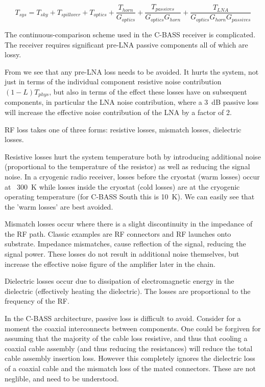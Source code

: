 \begin{equation}
 T_{sys} = T_{sky}+T_{spillover}+T_{optics} + \frac{T_{horn}}{G_{optics}} + \frac{T_{passives}}{G_{optics}G_{horn}}+\frac{T_{LNA}}{G_{optics}G_{horn}G_{passives}}
\label{eq:Friis_Equation}
\end{equation}

The continuous-comparison scheme used in the C-BASS receiver is complicated. The receiver requires significant pre-LNA passive components all of which are lossy. 

From  we see that any pre-LNA loss needs to be avoided. It hurts the system, not just in terms of the individual component resistive noise contribution $(1-L)T_{phys}$, but also in terms of the effect these losses have on subsequent components, in particular the LNA noise contribution, where a 3~dB passive loss will increase the effective noise contribution of the LNA by a factor of 2. 

RF loss takes one of three forms: resistive losses, mismatch losses, dielectric losses. 

Resistive losses hurt the system temperature both by introducing additional noise (proportional to the temperature of the resistor) as well as reducing the signal noise. In a cryogenic radio receiver, losses before the cryostat (warm losses) occur at ~300~K while losses inside the cryostat (cold losses) are at the cryogenic operating temperature (for C-BASS South this is 10~K). We can easily see that the 'warm losses' are best avoided. 

Mismatch losses occur where there is a slight discontinuity in the impedance of the RF path. Classic examples are RF connectors and RF launches onto substrate. Impedance mismatches, cause reflection of the signal, reducing the signal power. These losses do not result in additional noise themselves, but increase the effective noise figure of the amplifier later in the chain.

Dielectric losses occur due to dissipation of electromagnetic energy in the dielectric (effectively heating the dielectric). The losses are proportional to the frequency of the RF.



In the C-BASS architecture, passive loss is difficult to avoid. Consider for a moment the coaxial interconnects between components. One could be forgiven for assuming that the majority of the cable loss resistive, and thus that cooling a coaxial cable assembly (and thus reducing the resistances) will reduce the total cable assembly insertion loss. However this completely ignores the dielectric loss of a coaxial cable and the mismatch loss of the mated connectors. These are not neglible, and need to be understood.

